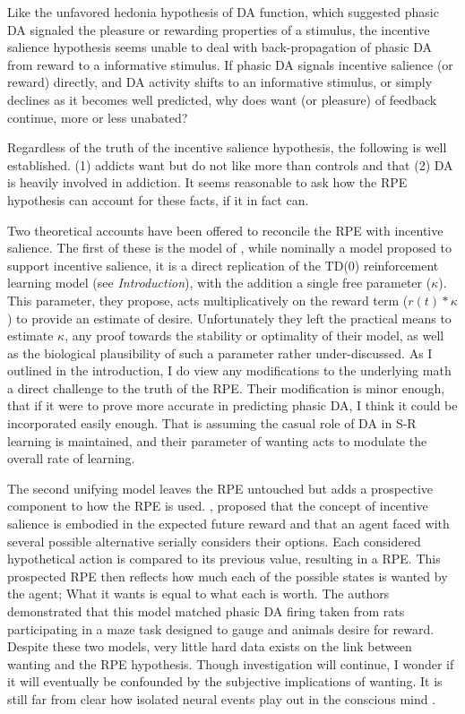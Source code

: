 \documentclass[doc]{apa}        %
\begin{document}
Like the unfavored hedonia hypothesis of DA function, which suggested phasic DA signaled the pleasure or rewarding properties of a stimulus, the incentive salience hypothesis seems unable to deal with back-propagation of phasic DA from reward to a informative stimulus. If phasic DA signals incentive salience (or reward) directly, and DA activity shifts to an informative stimulus, or simply declines as it becomes well predicted, why does want (or pleasure) of feedback continue, more or less unabated?  

Regardless of the truth of the incentive salience hypothesis, the following is well established. (1) addicts want but do not like more than controls and that (2) DA is heavily involved in addiction.  It seems reasonable to ask how the RPE hypothesis can account for these facts, if it in fact can.  

Two theoretical accounts have been offered to reconcile the RPE with incentive salience.  The first of these is the model of , while nominally a model proposed to support incentive salience, it is a direct replication of the TD(0) reinforcement learning model (see \emph{Introduction}), with the addition a single free parameter ($\kappa$).  This parameter, they propose, acts multiplicatively on the reward term ($r(t)*\kappa$) to provide an estimate of desire.  Unfortunately they left the practical means to estimate $\kappa$, any proof towards the stability or optimality of their model, as well as the biological plausibility of such a parameter rather under-discussed.  As I outlined in the introduction, I do view any modifications to the underlying math a direct challenge to the truth of the RPE.  Their modification is minor enough, that if it were to prove more accurate in predicting phasic DA, I think it could be incorporated easily enough.  That is assuming the casual role of DA in S-R learning is maintained, and their parameter of wanting acts to modulate the overall rate of learning.  

The second unifying model leaves the RPE untouched but adds a prospective component to how the RPE is used. , proposed that the concept of incentive salience is embodied in the expected future reward and that an agent faced with several possible alternative serially considers their options.  Each considered hypothetical action is compared to its previous value, resulting in a RPE.  This prospected RPE then reflects how much each of the possible states is wanted by the agent; What it wants is equal to what each is worth.  The authors demonstrated that this model matched phasic DA firing taken from rats participating in a maze task designed to gauge and animals desire for reward.  Despite these two models, very little hard data exists on the link between wanting and the RPE hypothesis.  Though investigation will continue, I wonder if it will eventually be confounded by the subjective implications of wanting.  It is still far from clear how isolated neural events play out in the conscious mind \cite{Koch:2007p7251}.   
\end{document}
